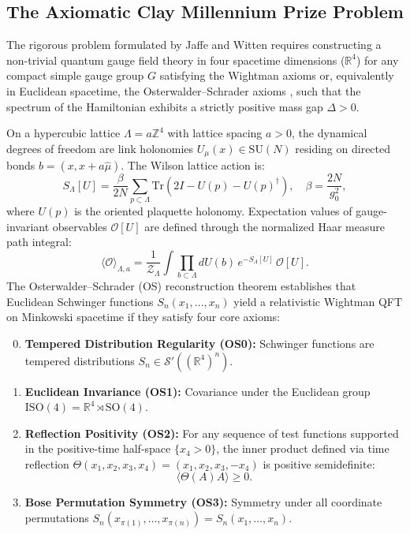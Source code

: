 \documentclass[11pt,a4paper]{article}
\theoremstyle{definition}
\theoremstyle{remark}
\newcommand{\R}{\mathbb{R}}
\newcommand{\Z}{\mathbb{Z}}
\newcommand{\SU}{\mathrm{SU}}
\newcommand{\tr}{\mathrm{Tr}}
\begin{document}
\subsection{The Axiomatic Clay Millennium Prize Problem}
The rigorous problem formulated by Jaffe and Witten \cite{JaffeWitten2000} requires constructing a non-trivial quantum gauge field theory in four spacetime dimensions ($\R^4$) for any compact simple gauge group $G$ satisfying the Wightman \cite{OsterwalderSchrader1973,OsterwalderSchrader1975} axioms or, equivalently in Euclidean spacetime, the Osterwalder--Schrader axioms \cite{OsterwalderSchrader1973,OsterwalderSchrader1975}, such that the spectrum of the Hamiltonian exhibits a strictly positive mass gap $\Delta > 0$.

On a hypercubic lattice $\Lambda = a \Z^4$ with lattice spacing $a > 0$, the dynamical degrees of freedom are link holonomies $U_\mu(x) \in \SU(N)$ residing on directed bonds $b = (x, x + a \hat{\mu})$. The Wilson lattice action \cite{Wilson1974} is:
\begin{equation}
S_\Lambda[U] = \frac{\beta}{2N} \sum_{p \subset \Lambda} \tr\left( 2 I - U(p) - U(p)^\dagger \right), \quad \beta = \frac{2N}{g_0^2},
\end{equation}
where $U(p)$ is the oriented plaquette holonomy. Expectation values of gauge-invariant observables $\mathcal{O}[U]$ are defined through the normalized Haar measure path integral:
\begin{equation}
\langle \mathcal{O} \rangle_{\Lambda, a} = \frac{1}{\mathcal{Z}_{\Lambda}} \int \prod_{b \subset \Lambda} dU(b) \, e^{-S_\Lambda[U]} \, \mathcal{O}[U].
\end{equation}
The Osterwalder--Schrader (OS) reconstruction theorem establishes that Euclidean Schwinger functions $S_n(x_1, \dots, x_n)$ yield a relativistic Wightman QFT on Minkowski spacetime if they satisfy four core axioms:
\begin{enumerate}[label=(\textbf{OS\arabic*})]
    \setcounter{enumi}{-1}
    \item \textbf{Tempered Distribution Regularity (OS0):} Schwinger functions are tempered distributions $S_n \in \mathcal{S}'((\R^4)^n)$.
    \item \textbf{Euclidean Invariance (OS1):} Covariance under the Euclidean group $\mathrm{ISO}(4) = \R^4 \rtimes \mathrm{SO}(4)$.
    \item \textbf{Reflection Positivity (OS2):} For any sequence of test functions supported in the positive-time half-space $\{x_4 > 0\}$, the inner product defined via time reflection $\Theta(x_1, x_2, x_3, x_4) = (x_1, x_2, x_3, -x_4)$ is positive semidefinite:
    \begin{equation}
    \langle \Theta(A) A \rangle \ge 0.
    \end{equation}
    \item \textbf{Bose Permutation Symmetry (OS3):} Symmetry under all coordinate permutations $S_n(x_{\pi(1)}, \dots, x_{\pi(n)}) = S_n(x_1, \dots, x_n)$.
\end{enumerate}
\end{document}
